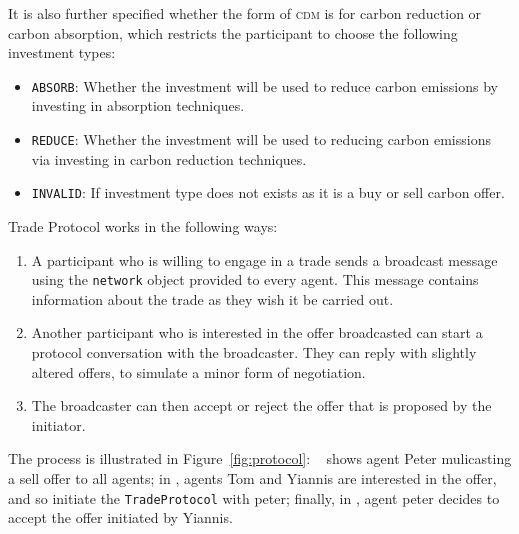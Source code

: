 It is also further specified whether the form of \textsc{cdm} is for carbon reduction or carbon absorption, which restricts the participant to choose the following investment types:

\begin{itemize}
	\item \texttt{ABSORB}: Whether the investment will be used to reduce carbon emissions by investing in absorption techniques.
	\item \texttt{REDUCE}: Whether the investment will be used to reducing carbon emissions via investing in carbon reduction techniques.
	\item \texttt{INVALID}: If investment type does not exists as it is a buy or sell carbon offer.
\end{itemize}

Trade Protocol works in the following ways:

\begin{enumerate}
	\item A participant who is willing to engage in a trade sends a broadcast message using the \texttt{network} object provided to every agent. This message contains information about the trade as they wish it be carried out.
	\item Another participant who is interested in the offer broadcasted can start a protocol conversation with the broadcaster. They can reply with slightly altered offers, to simulate a minor form of negotiation.
	\item The broadcaster can then accept or reject the offer that is proposed by the initiator.
\end{enumerate}

%
%

The process is illustrated in Figure~\ref{fig:protocol}: ~ shows agent Peter mulicasting a sell offer to all agents; in , agents Tom and Yiannis are interested in the offer, and so initiate the \texttt{TradeProtocol} with peter; finally, in , agent peter decides to accept the offer initiated by Yiannis.

